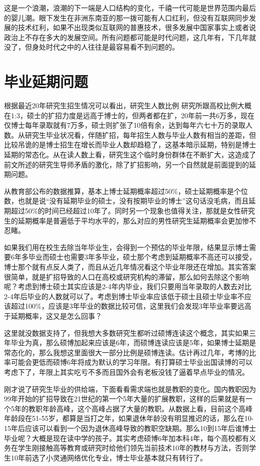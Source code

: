\documentclass[]{tufte-book}
\begin{document}
这是一个浪潮，浪潮的下一端是人口结构的变化，千禧一代可能是世界范围内最后的婴儿潮。眼下发生在非洲东南亚的那一拨可能有人口红利，但没有互联网同步发展的技术红利，如果不出现类似互联网的普惠技术，很多发展中国家事实上或者说政治上不存在多大的发展空间。所有问题都可能是时代问题，这几年有，下几年就没了，但身处时代之中的人往往是最容易看不到问题的。

\hypertarget{ux6bd5ux4e1aux5ef6ux671fux95eeux9898}{%
\section{毕业延期问题}\label{ux6bd5ux4e1aux5ef6ux671fux95eeux9898}}

根据最近20年研究生招生情况可以看出，研究生人数比例 研究所跟高校比例大概在1:3，硕士的扩招力度是远高于博士的，但两者都在扩，20年前一共6万多，现在仅博士每年录取就有7万多，硕士则扩张了10倍有余，达到每年六七十万的录取人数。从研究生毕业状况看，伴随扩招，每年招生人数与毕业人数有相当的差距，但比较吊诡的是博士招生在增长而毕业人数却趋稳了，这基本暗示延期，特别是博士延期的常态化。从在读人数上看，研究生这个临时身份群体在不断扩大，这造成了前文所述的研究生导师矛盾的激化，除了扩招影响，另一个自然就是前面提到的延期问题。

从教育部公布的数据推算，基本上博士延期概率超过50\%，硕士延期概率是个位数，也就是说``没有延期毕业的硕士，没有按期毕业的博士''这句话没毛病，而且延期超过50\%的时间已经超过10年了。同时另一个现象也值得关注，那就是女性研究生的延期概率是普遍低于平均水平的，那么对应的男性研究生延期概率会更加惨不忍睹。

如果我们用在校生去除当年毕业生，会得到一个预估的毕业年限，结果显示博士需要6年多毕业而硕士也需要3年多毕业，硕士那个考虑到延期概率不高还可以接受，博士那个就有点反人类了，而且从近几年情况看这个毕业年限还在增加。其实答案很简单，就是扩招导致的人口在高校或研究机构的滞留，那么如何去除这个影响呢？考虑到博士硕士其实应该是2-4年内毕业，我们只要用当年录取的人数去对比2-4年后毕业的人数就可以了。考虑到博士毕业率应该低于硕士且硕士毕业率不应该超过100\%，应该是3年毕业的数据比较可信，这里我们会发现3年毕业率要远高于延期概率，这又是怎么回事？

这里就没数据支持了，但我想大多数研究生都听过硕博连读这个概念，其实如果三年毕业为真，那么硕博加起来应该是6年，而硕博连读应该是5年，如果博士延期是常态化的，那么我想这里面很大一部分比例是硕博连读。估计再过几年，考博的比率可能会更低而硕博6年将成为默认的学习年限。有打算硕士毕业出国读博的可以考虑下了，年限上其实吃亏不多而且国外会有老板没钱了逼着早点毕业的情况。

刚才说了研究生毕业的供给端，下面看看需求端也就是教职的变化。国内教职因为99年开始的扩招导致在21世纪的第一个5年大量的扩展教职，这样的后果就是有一个5年的教职年龄高峰，这个高峰占据了大量的教职。从数据上看，目前这个高峰年龄段在51-55岁，都算是当打之年，如果退休年龄没有明显推迟的话，那么在10-15年后应该可以看到一个因为退休高峰导致的教职空缺期。那么10到15年后谁博士毕业呢？大概是现在读中学的孩子。其实考虑硕博6年加本科4年，每个高校都有义务在学生刚接触高等教育或研究时给他们领先当前技术10年的教材与方法，否则学生10年前选了小灵通网络优化专业，博士毕业基本就只有转行了。
\end{document}
